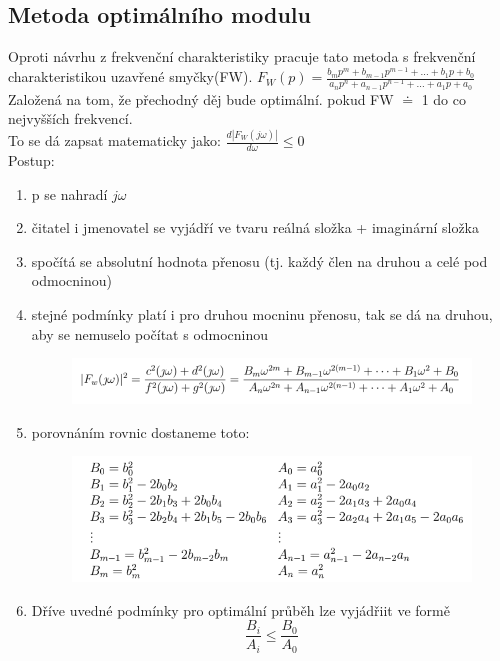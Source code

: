 \subsection*{Metoda optimálního modulu}
Oproti návrhu z frekvenční charakteristiky pracuje tato metoda s frekvenční charakteristikou uzavřené smyčky(FW). $F_W(p) = \frac{b_mp^m+b_{m-1}p^{m-1}+\dots + b_1p+b_0}{a_np^n+a_{n-1}p^{n-1}+\dots + a_1p+a_0}$\\
Založená na tom, že přechodný děj bude optimální. pokud FW $\doteq$ 1 do co nejvyšších frekvencí.\\
To se dá zapsat matematicky jako: $\frac{d|F_W(j\omega) |}{d\omega} \leq 0$\\
Postup:
\begin{enumerate}
    \item p se nahradí $j\omega$
    \item čitatel i jmenovatel se vyjádří ve tvaru reálná složka + imaginární složka
    \item spočítá se absolutní hodnota přenosu (tj. každý člen na druhou a celé pod odmocninou)
    \item stejné podmínky platí i pro druhou mocninu přenosu, tak se dá na druhou, aby se nemuselo počítat s odmocninou
          \begin{figure}[H]
              \includegraphics*[scale = 1.0]{images/optimalniModul1.png}
          \end{figure}
    \item porovnáním rovnic dostaneme toto:
          \begin{figure}[H]
              \includegraphics*[scale = 1.0]{images/optimalniModul2.png}
          \end{figure}
    \item Dříve uvedné podmínky pro optimální průběh lze vyjádřiit ve formě
          \begin{equation}
              \frac{B_i}{A_i} \leq \frac{B_0}{A_0}
          \end{equation}
\end{enumerate}

